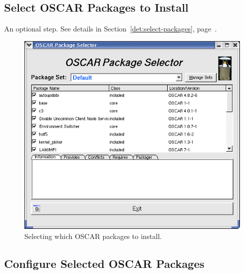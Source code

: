 
\subsection{Select OSCAR Packages to Install}

An optional step.  See details in Section~\ref{det:select-packages},
page~\pageref{det:select-packages}.

\begin{figure}[ht!]
  \begin{center}
    \centerline{\includegraphics[scale=\imgscale]{figs/package-selection}}
    \caption[Selecting which OSCAR packages to install.]{Selecting
      which OSCAR packages to install.}  
    \label{fig:sbs-package-selection}
  \end{center}
\end{figure}


\subsection{Configure Selected OSCAR Packages}

